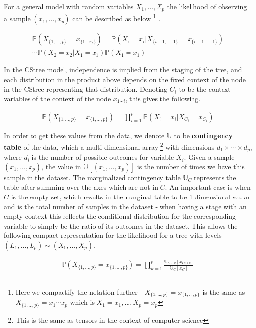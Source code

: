\documentclass{tufte-book}
\begin{document}
For a general model with random variables \(X_1,...,X_p\) the likelihood of observing a sample \((x_1,...,x_p)\) can be described as below  \footnote{Here we compactify the notation further - $X_{\{1,...,p\}}=x_{\{1,...,p\}}$ is the same as $X_{\{1,...,p\}}=x_1\cdots x_p$ which is $X_1=x_1,...,X_p=x_p$} 
.


\begin{align*}
\mathbb{P}(X_{\{1,...,p\}}=x_{\{1\cdots x_p\}}) =\mathbb{P}(X_i=x_i|X_{\{i-1,...,1\}}=x_{\{i-1,...,1 \}})\\\cdots\mathbb{P}(X_2=x_2|X_1=x_1)\mathbb{P}(X_1=x_1)
\end{align*}

In the CStree model, independence is implied from the staging of the tree, and each distribution in the product above depends on the fixed context of the node in the CStree representing that distribution. Denoting \(C_i\) to be the context variables of the context of the node \(x_{1\cdots i}\), this gives the following.

\begin{align*}
\mathbb{P}(X_{\{1,...,p\}}=x_{\{1,..., p\}}) =\prod_{i=1}^p \mathbb{P}(X_i=x_i|X_{C_i}=x_{C_i})
\end{align*}


In order to get these values from the data, we denote \(\mathbb{U}\) to be \textbf{contingency table} of the data, which a multi-dimensional array  \footnote{This is the same as tensors in the context of computer science}   with dimensions \(d_1 \times \cdots \times d_p\), where \(d_i\) is the number of possible outcomes for variable \(X_i\). Given a sample \((x_1,...,x_p)\), the value in \(\mathbb{U}[(x_1,...,x_p)]\) is the number of times we have this sample in the dataset. The marginalized contingency table \(\mathbb{U}_C\) represents the table after summing over the axes which are not in \(C\). An important case is when \(C\) is the empty set, which results in the marginal table to be 1 dimensional scalar and is the total number of samples in the dataset - when having a stage with an empty context this reflects the conditional distribution for the corresponding variable to simply be the ratio of its outcomes in the dataset. This allows the following compact representation for the likelihood \cite{duarte-2021-repres-learn} for a tree with levels \((L_1,...,L_p) \sim (X_1,...,X_p)\).

\begin{align*}
\mathbb{P}(X_{\{1,...,p\}}=x_{\{1,..., p\}}) = \prod_{k=1}^p \frac{\mathbb{U}_{C \cup k}[x_{C \cup k}]}{\mathbb{U}_{C}[x_{C}]}
\end{align*}
\end{document}
